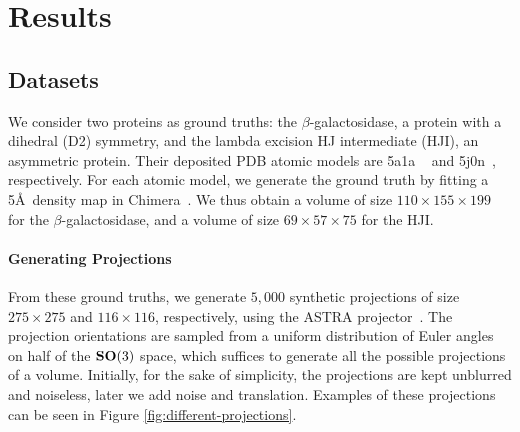 \section{Results}

\subsection{Datasets}\label{sec:results:data}


We consider two proteins as ground truths: the $\beta$-galactosidase, a protein with a dihedral (D2) symmetry, and the lambda excision HJ intermediate (HJI), an asymmetric protein.
Their deposited PDB atomic models are 5a1a ~\cite{bartesaghi2015betagal} and 5j0n~\cite{laxmikanthan2016structure}, respectively.
For each atomic model, we generate the ground truth by fitting a 5\AA\ density map in Chimera~\cite{pettersen2004ucsf}.
We thus obtain a volume of size $110\times 155\times 199$ for the $\beta$-galactosidase, and a volume of size $69\times 57\times 75$ for the HJI.

\paragraph{Generating Projections} 
From these ground truths, we generate $5,000$ synthetic projections of size $275\times 275$ and $116\times 116$, respectively, using the ASTRA projector~\cite{van2015astra}.
The projection orientations are sampled from a uniform distribution of Euler angles on half of the $\mathrm{\mathbf{SO}}(3)$ space, which suffices to generate all the possible projections of a volume.
Initially, for the sake of simplicity, the projections are kept unblurred and noiseless, later we add noise and translation. Examples of these projections can be seen in Figure \ref{fig:different-projections}.

